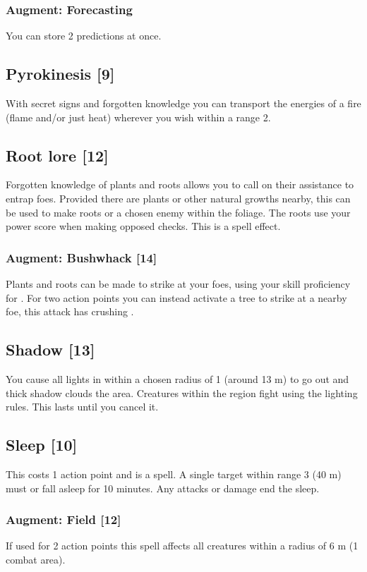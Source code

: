 \subsubsection{Augment: Forecasting}
You can store 2 predictions at once.

\subsection{Pyrokinesis [9]}
With secret signs and forgotten knowledge you can transport the energies of a fire (flame and/or just heat) wherever you wish within a range 2. 

\subsection{Root lore [12]}
Forgotten knowledge of plants and roots allows you to call on their assistance to entrap foes. Provided there are plants or other natural growths nearby, this can be used to make roots  or  a chosen enemy within the foliage. The roots use your  power score when making opposed checks. This is a  spell effect.
\subsubsection{Augment: Bushwhack [14]}
Plants and roots can be made to strike at your foes, using your  skill proficiency for . For two action points you can instead activate a tree to strike at a nearby foe, this attack has crushing .

\subsection{Shadow [13]}
You cause all lights in within a chosen radius of 1 (around 13 m) to go out and thick shadow clouds the area. Creatures within the region fight using the  lighting rules. This lasts until you cancel it.

\subsection{Sleep [10]}
This costs 1 action point and is a  spell. A single target within range 3 (40 m) must  or fall asleep for 10 minutes. Any attacks or damage end the sleep. 
\subsubsection{Augment: Field [12]}
If used for 2 action points this spell affects all creatures within a radius of 6 m (1 combat area).

